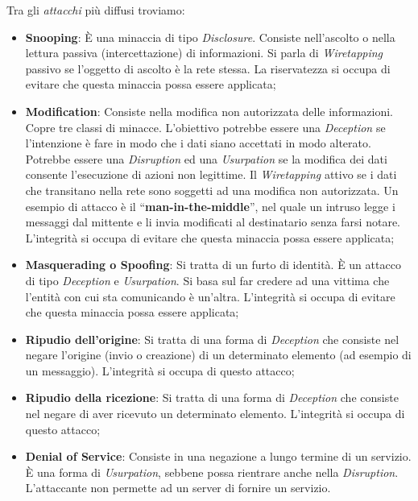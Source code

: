 Tra gli \textit{attacchi} più diffusi troviamo:

\begin{itemize}
    \item \textbf{Snooping}: È una minaccia di tipo \textit{Disclosure}.
          Consiste nell’ascolto o nella lettura passiva (intercettazione) di
          informazioni. Si parla di \textit{Wiretapping} passivo se l’oggetto
          di ascolto è la rete stessa. La riservatezza si occupa di evitare
          che questa minaccia possa essere applicata;
    \item \textbf{Modification}: Consiste nella modifica non autorizzata delle
          informazioni. Copre tre classi di minacce. L’obiettivo potrebbe essere
          una \textit{Deception} se l’intenzione è fare in modo che i dati siano
          accettati in modo alterato. Potrebbe essere una \textit{Disruption}
          ed una \textit{Usurpation} se la modifica dei dati consente l’esecuzione
          di azioni non legittime. Il \textit{Wiretapping} attivo se i dati che
          transitano nella rete sono soggetti ad una modifica non autorizzata.
          Un esempio di attacco è il “\textbf{man-in-the-middle}”, nel quale un
          intruso legge i messaggi dal mittente e li invia modificati al
          destinatario senza farsi notare. L’integrità si occupa di evitare che
          questa minaccia possa essere applicata;
    \item \textbf{Masquerading o Spoofing}: Si tratta di un furto di identità.
          È un attacco di tipo \textit{Deception} e \textit{Usurpation}.
          Si basa sul far credere ad una vittima che l’entità con cui sta
          comunicando è un’altra. L’integrità si occupa di evitare che questa
          minaccia possa essere applicata;
    \item \textbf{Ripudio dell’origine}: Si tratta di una forma di \textit{Deception}
          che consiste nel negare l’origine (invio o creazione) di un determinato
          elemento (ad esempio di un messaggio). L’integrità si occupa di questo
          attacco;
    \item \textbf{Ripudio della ricezione}: Si tratta di una forma di \textit{Deception}
          che consiste nel negare di aver ricevuto un determinato elemento.
          L’integrità si occupa di questo attacco;
    \item \textbf{Denial of Service}: Consiste in una negazione a lungo termine
          di un servizio. È una forma di \textit{Usurpation}, sebbene possa
          rientrare anche nella \textit{Disruption}. L’attaccante non permette
          ad un server di fornire un servizio.
\end{itemize}

